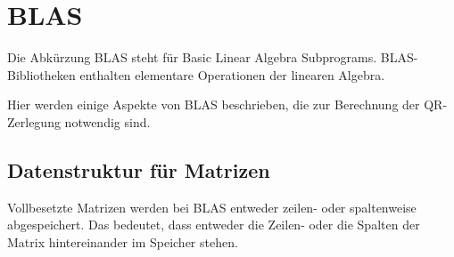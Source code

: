\chapter{BLAS}
Die Abkürzung BLAS steht für Basic Linear Algebra Subprograms. 
BLAS-Bibliotheken enthalten elementare Operationen der linearen Algebra.

Hier werden einige Aspekte von BLAS beschrieben, die zur Berechnung der QR-Zerlegung notwendig sind.

\section{Datenstruktur für Matrizen}
Vollbesetzte Matrizen werden bei BLAS entweder zeilen- oder spaltenweise abgespeichert. Das bedeutet, dass entweder die Zeilen- oder die Spalten der Matrix hintereinander im Speicher stehen.  


